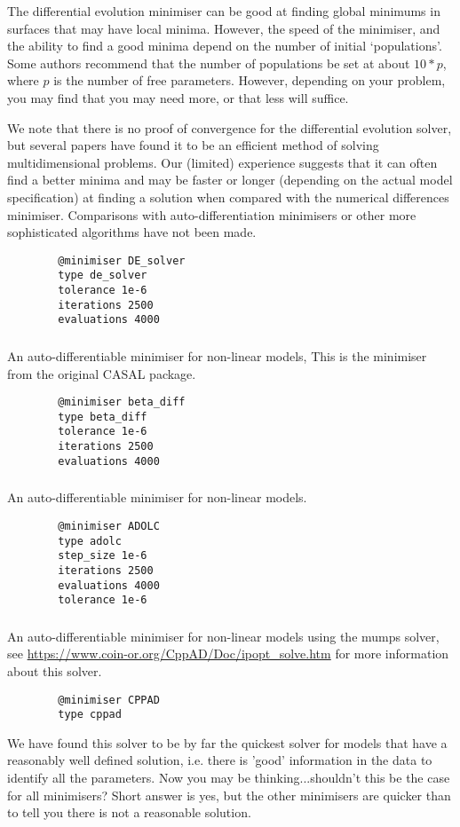 The differential evolution minimiser can be good at finding global minimums in surfaces that may have local minima. However, the speed of the minimiser, and the ability to find a good minima depend on the number of initial `populations'. Some authors recommend that the number of populations be set at about $10*p$, where $p$ is the number of free parameters. However, depending on your problem, you may find that you may need more, or that less will suffice.

We note that there is no proof of convergence for the differential evolution solver, but several papers have found it to be an efficient method of solving multidimensional problems. Our (limited) experience suggests that it can often find a better minima and may be faster or longer (depending on the actual model specification) at finding a solution when compared with the numerical differences minimiser. Comparisons with auto-differentiation minimisers or other more sophisticated algorithms have not been made. 

{\small{\begin{verbatim}
		@minimiser DE_solver
		type de_solver
		tolerance 1e-6
		iterations 2500
		evaluations 4000
		\end{verbatim}}}

\subsubsection{}
An auto-differentiable minimiser for non-linear models, This is the minimiser from the original CASAL package.
{\small{\begin{verbatim}
		@minimiser beta_diff
		type beta_diff
		tolerance 1e-6
		iterations 2500
		evaluations 4000
		\end{verbatim}}}
\subsubsection{}
An auto-differentiable minimiser for non-linear models.
{\small{\begin{verbatim}
		@minimiser ADOLC
		type adolc
		step_size 1e-6
		iterations 2500
		evaluations 4000
		tolerance 1e-6		
		\end{verbatim}}}
\subsubsection{}
An auto-differentiable minimiser for non-linear models using the mumps solver, see \url{https://www.coin-or.org/CppAD/Doc/ipopt_solve.htm} for more information about this solver.
{\small{\begin{verbatim}
		@minimiser CPPAD
		type cppad
		\end{verbatim}}}
We have found this solver to be by far the quickest solver for models that have a reasonably well defined solution, i.e. there is 'good' information in the data to identify all the parameters. Now you may be thinking...shouldn't this be the case for all minimisers? Short answer is yes, but the other minimisers are quicker than  to tell you there is not a reasonable solution. 

